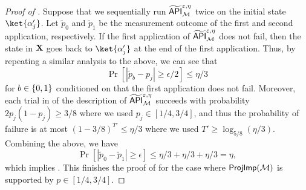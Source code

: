 \begin{proof}[Proof of ]
  Suppose that we sequentially run $\widetilde{\mathsf{API}}^{\varepsilon,\eta}_{\mathcal{M}}$ twice on the initial state $\ket{\alpha'_j}$.  
Let $\tilde{p}_0$ and $\tilde{p}_1$ be the measurement outcome of the first and second application, respectively. 
If the first application of $\widetilde{\mathsf{API}}^{\varepsilon,\eta}_{\mathcal{M}}$ does not fail, then the state in $\mathbf{X}$ goes back to $\ket{\alpha'_j}$ at the end of the first application. 
Thus, by repeating a similar analysis to the above, we can see that 
$$
\Pr[|\tilde{p}_b-p_j|\ge \epsilon/2]\le \eta/3
$$
for $b\in \{0,1\}$ 
conditioned on that the first application does not fail. 
Moreover, each trial in  of the description of $\widetilde{\mathsf{API}}^{\varepsilon,\eta}_{\mathcal{M}}$  
succeeds with probability $2p_j(1-p_j)\ge 3/8$  
where we used $p_j\in [1/4,3/4]$, and thus the probability of failure is at most $(1-3/8)^{T'}\le \eta/3$  
where we used $T'\ge \log_{5/8}(\eta/3)$. 
Combining the above, we have 
$$
\Pr[|\tilde{p}_0-\tilde{p}_1|\ge \epsilon]\le 
\eta/3+\eta/3+\eta/3=
\eta,
$$
which implies . 
This finishes the proof of  for the case where $\mathsf{ProjImp}(\mathcal{M})$ is supported by $p\in [1/4,3/4]$. 


\end{proof}
